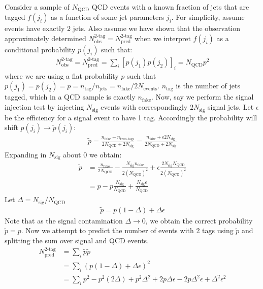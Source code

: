 Consider a sample of $N_{\textrm{QCD}}$ QCD events with a known fraction of jets that are tagged $f(j_i)$ as a function of some jet parameters $j_i$. 
For simplicity, assume events have exactly 2 jets. Also assume 
we have shown that the observation approximately determined $N_{\textrm{obs}}^{\textrm{2-tag}} = N_{\textrm{pred}}^{\textrm{2-tag}}$ when we interpret $f(j_i)$ as a conditional probability 
$p(j_i)$ such that:
\begin{align*}
N_{\textrm{obs}}^{\textrm{2-tag}} = N_{\textrm{pred}}^{\textrm{2-tag}} = \sum_i [p(j_1)p(j_2)]_{i}  = N_{\textrm{QCD}}p^2 
\end{align*}
where we are using a flat probability $p$ such that  $p(j_1)=p(j_2)=p=n_{\textrm{tag}}/n_{\textrm{jets}} =  n_{\textrm{fake}} / 2N_{\textrm{events}}$. $n_{\textrm{tag}}$ is the number of jets tagged, which in a QCD sample is exactly $n_{\textrm{fake}}$. Now, say we perform the signal injection test by
injecting $N_{\textrm{sig}}$ events with correspondingly $2N_{\textrm{sig}}$ signal jets. Let $\epsilon$ be the efficiency for a signal event to have 1 tag. 
 Accordingly the probability will shift $p(j_i)\rightarrow \tilde{p}(j_i)$:
\begin{align*}
\tilde{p} = \frac{n_{\textrm{fake}} + n_{\textrm{true-tags}}}{2N_{\textrm{QCD}} + 2N_{\textrm{sig}}} = \frac{n_{\textrm{fake}} + \epsilon 2N_{\textrm{sig}} }{2N_{\textrm{QCD}} + 2N_{\textrm{sig}}}
\end{align*}
Expanding in $N_{\textrm{sig}}$ about 0 we obtain:
\begin{align*}
\tilde{p} &= \frac{n_{\textrm{fake}}}{2N_{\textrm{QCD}}} - \frac{N_{\textrm{sig}}n_{\textrm{fake}}}{2(N_{\textrm{QCD}})^2} + \epsilon\frac{2N_{\textrm{sig}} N_{\textrm{QCD}}}{2(N_{\textrm{QCD}})^2}\\
&= p - p\frac{N_{\textrm{sig}}}{N_{\textrm{QCD}}} + \frac{N_{\textrm{sig}}\epsilon}{N_{\textrm{QCD}}}
\end{align*}
Let $\Delta = N_{\textrm{sig}}/{N_{\textrm{QCD}}}$
\begin{align*}
\tilde{p} = p(1-\Delta) + \Delta\epsilon
\end{align*}
Note that as the signal contamination  $\Delta\rightarrow 0$, we obtain the correct probability $\tilde{p}=p$. 
Now we attempt to predict the number of events with 2 tags using $\tilde{p}$ and splitting the sum over signal and QCD events.
\begin{align*}
N_{\textrm{pred}}^{\textrm{2-tag}} &= \sum_i \tilde{p}\tilde{p}\\ 
&= \sum_i (p(1-\Delta) + \Delta\epsilon)^2\\ 
&= \sum_i p^2 - p^2(2\Delta) + p^2\Delta^2 + 2p\Delta \epsilon - 2 p \Delta^2 \epsilon + \Delta^2 \epsilon^2
\end{align*}
